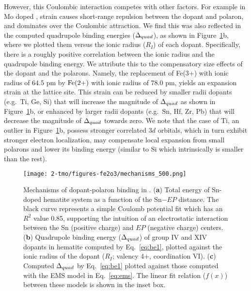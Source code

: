 However, this Coulombic interaction competes with other factors. For example
in Mo doped \cite{wu2018combining}, strain causes short-range repulsion between the dopant and polaron, and dominates over the Coulombic attraction.\cite{wu2018combining,zhang2018unconventional}
We find this was also reflected in the computed quadrupole binding energies ($\Delta_{quad}$), as shown in Figure~\ref{fig:mechanisms}b, where we plotted them versus the ionic radius ($R_I$) of each dopant.
Specifically, there is a roughly positive correlation between the ionic radius and the quadrupole binding energy. We attribute this to the compensatory size effects of the dopant and the polarons. Namely, the replacement of Fe(3+) with ionic radius of 64.5 pm by $\rm Fe (2+)$ with ionic radius of 78.0 pm, yields an expansion strain at the lattice site. This strain can be reduced by smaller radii dopants (e.g.\ Ti, Ge, Si) that will increase the magnitude of $\Delta_{quad}$ as shown in Figure~\ref{fig:mechanisms}b, or enhanced by larger radii dopants (e.g.\ Sn, Hf, Zr, Pb) that will decrease the magnitude of $\Delta_{quad}$ towards zero.
We note that the case of Ti, an outlier in Figure~\ref{fig:mechanisms}b, possess stronger correlated $3d$ orbitals, which in turn exhibit stronger electron localization, may compensate local expansion from small polarons  and lower its binding energy (similar to Si which intrinsically is smaller than the rest).

\begin{figure}[H]
    \centering
    \texttt{[image: 2-tmo/figures-fe2o3/mechanisms\_500.png]} %
    \caption{
    Mechanisms of dopant-polaron binding in .
    (\textbf{a}) Total energy of Sn-doped hematite system as a function of the Sn$-EP$ distance.
    The black curve represents a simple Coulomb potential fit which has an $R^2$ value 0.85, supporting the intuition of an electrostatic interaction between the Sn (positive charge) and $EP$ (negative charge) centers.
    (\textbf{b}) Quadrupole binding energy ($\Delta_{quad}$) of group IV and XIV dopants in hematite computed by Eq.~\ref{eq:be1}, plotted against the ionic radius of the dopant\cite{shannon1976revised} ($R_I$; valency 4+, coordination VI).
    (\textbf{c}) Computed $\Delta_{quad}$ by Eq.~\ref{eq:be1} plotted against those computed with the EMS model in Eq.~\ref{eq:ems}. The linear fit relation ($f(x)$) between these models is shown in the inset box.
    }
    \label{fig:mechanisms}
\end{figure}


